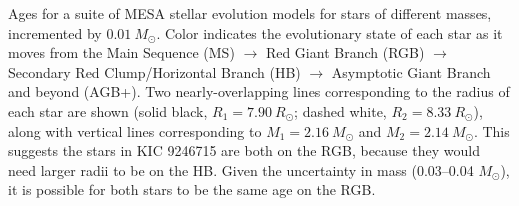 \label{fig:mesa} Ages for a suite of MESA stellar evolution models for stars of different masses, incremented by $0.01 \ M_\odot$. Color indicates the evolutionary state of each star as it moves from the Main Sequence (MS) $\rightarrow$ Red Giant Branch (RGB) $\rightarrow$ Secondary Red Clump/Horizontal Branch (HB) $\rightarrow$ Asymptotic Giant Branch and beyond (AGB+). Two nearly-overlapping lines corresponding to the radius of each star are shown (solid black, $R_1 = 7.90 \ R_\odot$; dashed white, $R_2 = 8.33 \ R_\odot$), along with vertical lines corresponding to $M_1 = 2.16 \ M_\odot$ and $M_2 = 2.14 \ M_\odot$. This suggests the stars in KIC 9246715 are both on the RGB, because they would need larger radii to be on the HB. Given the uncertainty in mass (0.03--0.04 $M_\odot$), it is possible for both stars to be the same age on the RGB.

  
  
  